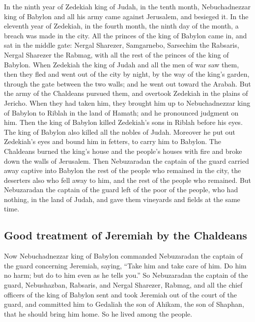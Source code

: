  In the ninth year of Zedekiah king of Judah, in the tenth
month, Nebuchadnezzar king of Babylon and all his army came against
Jerusalem, and besieged it.  In the eleventh year of
Zedekiah, in the fourth month, the ninth day of the month, a breach was
made in the city.  All the princes of the king of Babylon
came in, and sat in the middle gate: Nergal Sharezer, Samgarnebo,
Sarsechim the Rabsaris, Nergal Sharezer the Rabmag, with all the rest of
the princes of the king of Babylon.  When Zedekiah the
king of Judah and all the men of war saw them, then they fled and went
out of the city by night, by the way of the king's garden, through the
gate between the two walls; and he went out toward the Arabah.
 But the army of the Chaldeans pursued them, and overtook
Zedekiah in the plains of Jericho. When they had taken him, they brought
him up to Nebuchadnezzar king of Babylon to Riblah in the land of
Hamath; and he pronounced judgment on him.  Then the king
of Babylon killed Zedekiah's sons in Riblah before his eyes. The king of
Babylon also killed all the nobles of Judah.  Moreover he
put out Zedekiah's eyes and bound him in fetters, to carry him to
Babylon.  The Chaldeans burned the king's house and the
people's houses with fire and broke down the walls of Jerusalem.
 Then Nebuzaradan the captain of the guard carried away
captive into Babylon the rest of the people who remained in the city,
the deserters also who fell away to him, and the rest of the people who
remained.  But Nebuzaradan the captain of the guard left
of the poor of the people, who had nothing, in the land of Judah, and
gave them vineyards and fields at the same time.

\hypertarget{good-treatment-of-jeremiah-by-the-chaldeans}{%
\subsection{Good treatment of Jeremiah by the
Chaldeans}\label{good-treatment-of-jeremiah-by-the-chaldeans}}

 Now Nebuchadnezzar king of Babylon commanded Nebuzaradan
the captain of the guard concerning Jeremiah, saying, 
``Take him and take care of him. Do him no harm; but do to him even as
he tells you.''  So Nebuzaradan the captain of the guard,
Nebushazban, Rabsaris, and Nergal Sharezer, Rabmag, and all the chief
officers of the king of Babylon  sent and took Jeremiah
out of the court of the guard, and committed him to Gedaliah the son of
Ahikam, the son of Shaphan, that he should bring him home. So he lived
among the people.

